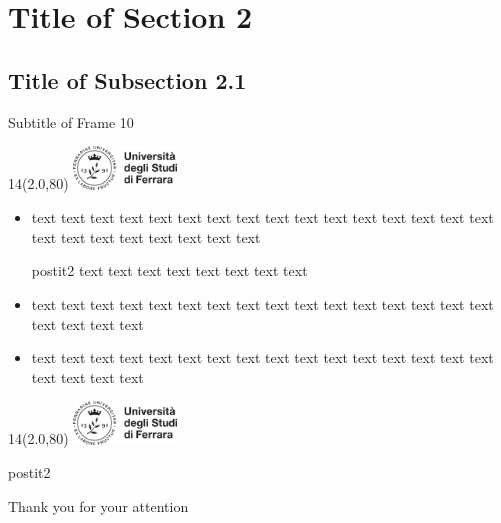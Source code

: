\documentclass[11pt,xcolor={dvipsnames}]{beamer} %
\newcommand{\MyLogo}{%
\begin{textblock}{14}(2.0,80)
 \includegraphics[height=1.15cm, angle=0]{logo}
\end{textblock}
}
\begin{document}
\section{Title of Section 2}

\subsection{Title of Subsection 2.1}
\begin{frame}{Subtitle of Frame 10}
\transboxin
\MyLogo
\begin{itemize}
\item<1-> text text text text text text text text text text text text text text text text text text text text text text text text
\begin{beamercolorbox}[center, shadow=false, rounded=true]{postit2}
text text text text text text text text 
\end{beamercolorbox}
\item<2->  text text text text text text text text text text text text text text text text text text text text
\item<3->  text text text text text text text text text text text text text text text text text text text text
\end{itemize}
\end{frame}

%
%


\begin{frame}
\transboxin
\MyLogo
\vspace{1.0cm}
\begin{beamercolorbox}[sep=1.0cm, center, shadow=false, rounded=true]{postit2}
\begin{Huge}Thank you for your attention\end{Huge}
\end{beamercolorbox}
\pause
\end{frame}
\end{document}
